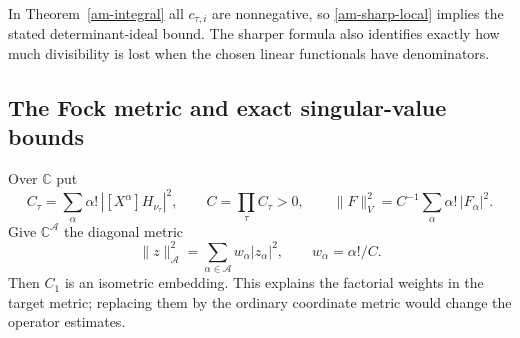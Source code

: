 In Theorem~\ref{am-integral} all $c_{\tau,i}$ are nonnegative, so
\eqref{am-sharp-local} implies the stated determinant-ideal bound.
The sharper formula also identifies exactly how much divisibility is
lost when the chosen linear functionals have denominators.

\subsection{The Fock metric and exact singular-value bounds}

Over $\mathbb C$ put
\[
 C_\tau=\sum_\alpha\alpha!\,|[X^\alpha]H_{\nu_\tau}|^2,
 \qquad C=\prod_\tau C_\tau>0,
 \qquad
 \|F\|_V^2=C^{-1}\sum_\alpha\alpha!\,|F_\alpha|^2.
\]
Give $\mathbb C^{\mathcal A}$ the diagonal metric
\begin{equation}\label{am-coordinate-metric}
 \|z\|_{\mathcal A}^2
       =\sum_{\alpha\in\mathcal A}w_\alpha|z_\alpha|^2,
       \qquad w_\alpha=\alpha!/C.
\end{equation}
Then $C_1$ is an isometric embedding. This explains the factorial weights
in the target metric; replacing them by the ordinary coordinate metric
would change the operator estimates.

